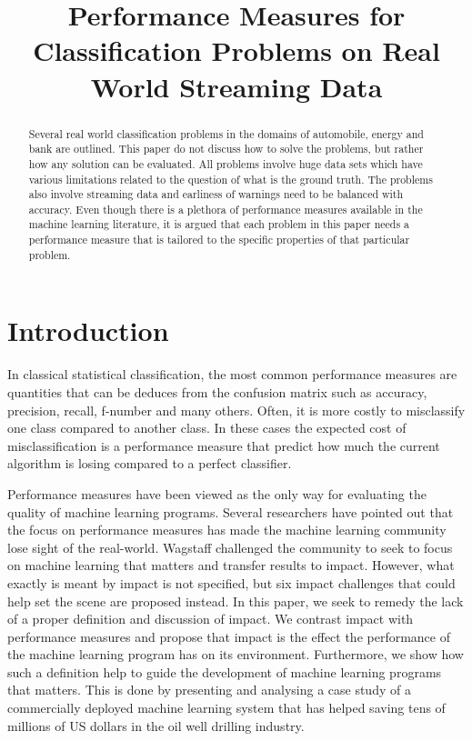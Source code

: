 \documentclass{article}
\title{Performance Measures for Classification Problems on Real World Streaming Data}
\date{}
\begin{document}
\maketitle

\begin{abstract}
Several real world classification problems in the domains of automobile, energy and bank are outlined.  This paper do not discuss how to solve the problems, but rather how any solution can be evaluated.  All problems involve huge data sets which have various limitations related to the question of what is the ground truth. The problems also involve streaming data and earliness of warnings need to be balanced with accuracy.  Even though there is a plethora of performance measures available in the machine learning literature, it is argued that each problem in this paper needs a performance measure that is tailored to the specific properties of that particular problem.
\end{abstract}

\section{Introduction}

In classical statistical classification, the most common performance measures are quantities that can be deduces from the confusion matrix such as accuracy, precision, recall, f-number and many others. Often, it is more costly to misclassify one class compared to another class. In these cases the expected cost of misclassification is a performance measure that predict how much the current algorithm is losing compared to a perfect classifier.  


Performance measures have been viewed as the only way for evaluating the quality of machine learning programs.
Several researchers have pointed out that the focus on performance measures has made the machine learning community lose sight of the real-world.
Wagstaff  \cite{Wagstaff_2012} challenged the community to seek to focus on machine learning that matters and transfer results to impact.
However, what exactly is meant by impact is not specified, but six impact challenges that could help set the scene are proposed instead.
In this paper, we seek to remedy the lack of a proper definition and discussion of impact.
We contrast impact with performance measures and propose that impact is the effect the performance of the machine learning program has on its environment.
Furthermore, we show how such a definition help to guide the development of machine learning programs that matters.
This is done by presenting and analysing a case study of a commercially deployed machine learning system that has helped saving tens of millions of US dollars in the oil well drilling industry.
\end{document}
